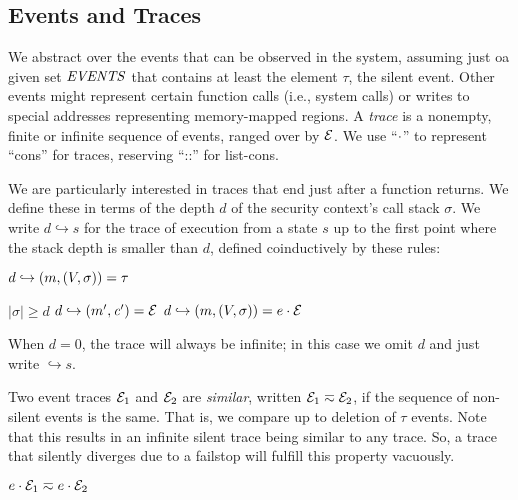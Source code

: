 \documentclass[10pt,conference]{ieeetran}%
\theoremstyle{definition}
\begin{document}
\subsection{Events and Traces}
\label{sec:events}

We abstract over the events that can be observed in the system, assuming just 
oa given set \(\mathit{EVENTS}\) that contains at least the element \(\tau\), the silent
event. Other events might represent certain function calls (i.e., system calls)
or writes to special addresses representing memory-mapped regions.
A {\em trace} is a nonempty, finite or infinite sequence
of events, ranged over by \(\mathcal{E}\).
We use ``\(\cdot\)'' to represent ``cons'' for traces, reserving ``::''
for list-cons.

We are particularly interested in traces that end just after a function returns.
We define these in terms of the depth \(d\) of the security context's call stack \(\sigma\).
We write \(d \hookrightarrow s\) for the trace of execution from a state \(s\)
up to the first point where the stack depth is smaller than \(d\), defined
coinductively by these rules:

         {\(d \hookrightarrow (m,(V,\sigma)) = \tau\)}

              {\(|\sigma| \geq d\)}
              {\(d \hookrightarrow (m',\mathit{c}') = \mathcal{E}\)}
              {\(d \hookrightarrow (m,(V,\sigma)) = e \cdot \mathcal{E}\)}

\noindent
When \(d = 0\), the trace will always be infinite; in this case we
omit \(d\) and just write \(\hookrightarrow s\).

Two event traces $\mathcal{E}_1$ and $\mathcal{E}_2$ are {\em similar},
written \(\mathcal{E}_1 \eqsim \mathcal{E}_2\), if the sequence of non-silent events
is the same. That is, we compare up to deletion of \(\tau\) events.
Note that this results in an infinite silent trace being similar to
any trace. So, a trace that silently diverges due to a failstop  will
fulfill this property vacuously.

\begin{minipage}{.4\columnwidth}
  \judgment{}{\(\obsT \eqsim \obsT\)}
\end{minipage}
\begin{minipage}{.4\columnwidth}
           {\(e \cdot \mathcal{E}_1 \eqsim e \cdot \mathcal{E}_2\)}
\end{minipage}
\end{document}
